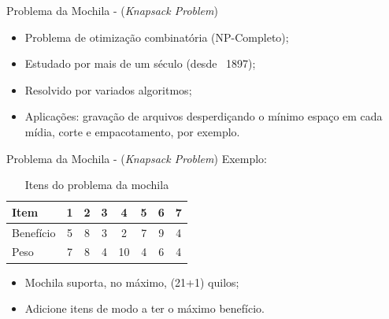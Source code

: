 \documentclass[12pt]{beamer}
\begin{document}
		\begin{frame}{Problema da Mochila - (\textit{Knapsack Problem})}
			\justifying
			\begin{itemize}
				\item Problema de otimização combinatória (NP-Completo);
				\item Estudado por mais de um século (desde ~1897);
				\item Resolvido por variados algoritmos;
				\item Aplicações: gravação de arquivos desperdiçando o mínimo espaço em cada mídia, corte e empacotamento, por exemplo.
			\end{itemize}
		\end{frame}
		
		\begin{frame}{Problema da Mochila - (\textit{Knapsack Problem})}
			Exemplo:
			
			\begin{table}[h]
				\centering
				\begin{tabular}{l|c|c|c|c|c|c|c|}
					\hline
					Item & 1 & 2 & 3 & 4 & 5 & 6 & 7 \\
					\hline
					Benefício & 5 & 8 & 3 & 2 & 7 & 9 & 4 \\
					\hline
					Peso & 7 & 8 & 4 & 10 & 4 & 6 & 4 \\
					\hline
				\end{tabular}
				\caption{Itens do problema da mochila}
			\end{table}
			
			\begin{itemize}
				\item Mochila suporta, no máximo, (21+1) quilos;
				\item Adicione itens de modo a ter o máximo
				benefício.
			\end{itemize}
		\end{frame}
		
		
		
\end{document}
